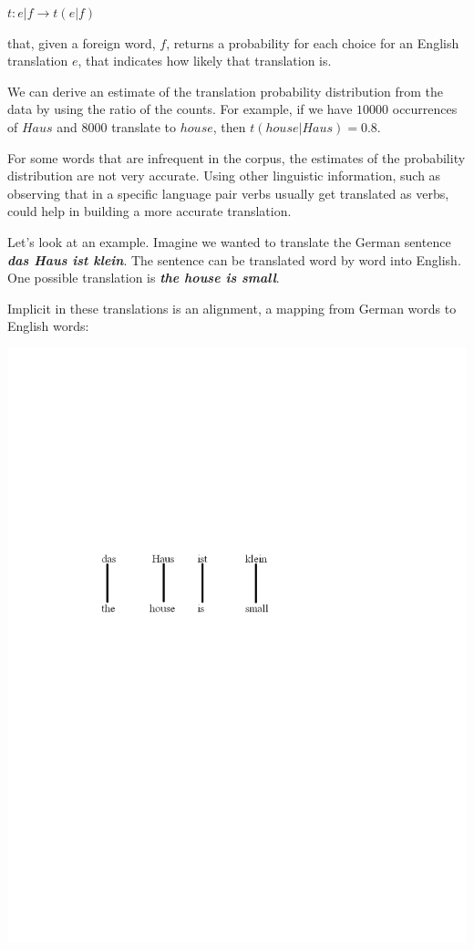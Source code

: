 \documentclass[10pt]{report}
\theoremstyle{plain}
\begin{document}
{\begin{center}
$t : e|f \rightarrow t(e|f)$
\end{center}

that, given a foreign word, $f$, returns a probability for each
choice for an English translation $e$, that indicates how likely
that translation is.


We can derive an estimate of the translation probability
distribution from the data by using the ratio of the counts. For
example, if we have $10000$ occurrences of $Haus$ and $8000$
translate to $house$, then $t(house|Haus)=0.8$.

For some words that are infrequent in the corpus, the estimates of
the probability distribution are not very accurate. Using other
linguistic information, such as observing that in a specific
language pair verbs usually get translated as verbs, could help in
building a more accurate translation.

Let's look at an example. Imagine we wanted to translate the German
sentence \textbf{\emph{das Haus ist klein}}. The sentence can be
translated word by word into English. One possible translation is
\textbf{\emph{the house is small}}.


Implicit in these translations is an alignment, a mapping from
German words to English words:

\includegraphics[viewport = 100 440 400 530,clip]{constantin-figure1.pdf}

}
\end{document}
